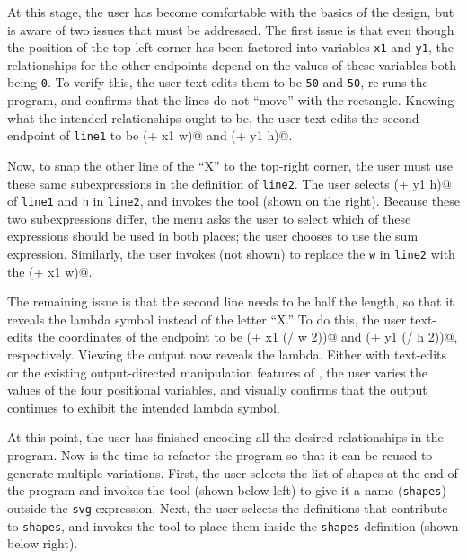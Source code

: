 
At this stage, the user has become comfortable with the basics of the
design, but is aware of two issues that must be addressed.
The first issue is that even though the position of the top-left
corner has been factored into variables \verb+x1+ and \verb+y1+,
the relationships for the other endpoints depend on the values of these
variables both being \verb+0+. To verify this,
the user text-edits them to be \verb+50+ and \verb+50+, re-runs the
program, and confirms that the lines do not ``move'' with the rectangle.
Knowing what the intended relationships ought to be, the user
text-edits the second endpoint of \verb+line1+ to be \verb@(+ x1 w)@ and
\verb@(+ y1 h)@.


Now, to snap the other line of the ``X'' to the
top-right corner, the user must use these same subexpressions in the
definition of \verb+line2+. The user selects \verb@(+ y1 h)@ of \verb+line1+
and \verb+h+ in \verb+line2+, and invokes the  tool (shown
on the right). Because these
two subexpressions differ, the \deuce{} menu asks the user to select which
of these expressions should be used in both places; the user chooses
to use the sum expression. Similarly, the user invokes  (not
shown) to replace the \verb+w+ in \verb+line2+ with the \verb@(+ x1 w)@.

The remaining issue is that the second line needs to be half the
length, so that it reveals the lambda symbol instead of the letter
``X.'' To do this, the user text-edits the coordinates of the
endpoint to be \verb@(+ x1 (/ w 2))@ and \verb@(+ y1 (/ h 2))@,
respectively. Viewing the output now reveals the lambda. Either with
text-edits or the existing output-directed manipulation features of
\sns{}, the user
varies the values of the four positional variables, and visually
confirms that the output continues to exhibit the intended lambda
symbol.


At this point, the user has finished encoding all the desired
relationships in the program. Now is the time to refactor the program
so that it can be reused to generate multiple variations. First, the
user selects the list of shapes at the end of the program
and invokes the  tool
(shown below left) to give it a name (\verb+shapes+) outside the \verb+svg+
expression. Next, the user selects the definitions that contribute to
\verb+shapes+, and invokes the  tool to place them inside
the \verb+shapes+ definition (shown below right).

